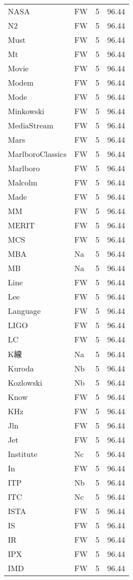 \documentclass[twocolumn]{book}
\begin{document}
\begin{supertabular}{llrr}
NASA & FW & 5 &  96.44\\
N2 & FW & 5 &  96.44\\
Must & FW & 5 &  96.44\\
Mt & FW & 5 &  96.44\\
Movie & FW & 5 &  96.44\\
Modem & FW & 5 &  96.44\\
Mode & FW & 5 &  96.44\\
Minkowski & FW & 5 &  96.44\\
MediaStream & FW & 5 &  96.44\\
Mars & FW & 5 &  96.44\\
MarlboroClassics & FW & 5 &  96.44\\
Marlboro & FW & 5 &  96.44\\
Malcolm & FW & 5 &  96.44\\
Made & FW & 5 &  96.44\\
MM & FW & 5 &  96.44\\
MERIT & FW & 5 &  96.44\\
MCS & FW & 5 &  96.44\\
MBA & Na & 5 &  96.44\\
MB & Na & 5 &  96.44\\
Line & FW & 5 &  96.44\\
Lee & FW & 5 &  96.44\\
Language & FW & 5 &  96.44\\
LIGO & FW & 5 &  96.44\\
LC & FW & 5 &  96.44\\
K線 & Na & 5 &  96.44\\
Kuroda & Nb & 5 &  96.44\\
Kozlowski & Nb & 5 &  96.44\\
Know & FW & 5 &  96.44\\
KHz & FW & 5 &  96.44\\
Jln & FW & 5 &  96.44\\
Jet & FW & 5 &  96.44\\
Institute & Nc & 5 &  96.44\\
In & FW & 5 &  96.44\\
ITP & Nb & 5 &  96.44\\
ITC & Nc & 5 &  96.44\\
ISTA & FW & 5 &  96.44\\
IS & FW & 5 &  96.44\\
IR & FW & 5 &  96.44\\
IPX & FW & 5 &  96.44\\
IMD & FW & 5 &  96.44\\

\end{supertabular}
\end{document}
